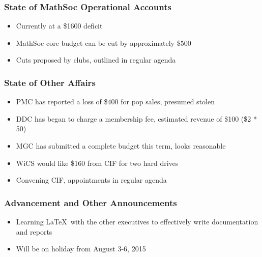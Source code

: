 \subsubsection*{State of MathSoc Operational Accounts}
\begin{itemize}
\item Currently at a \$1600 deficit
\item MathSoc core budget can be cut by approximately \$500 
\item Cuts proposed by clubs, outlined in regular agenda
\end{itemize}

\subsubsection*{State of Other Affairs}
\begin{itemize}
\item PMC has reported a loss of \$400 for pop sales, presumed stolen
\item DDC has began to charge a membership fee, estimated revenue of \$100 (\$2 * 50)
\item MGC has submitted a complete budget this term, looks reasonable
\item WiCS would like \$160 from CIF for two hard drives
\item Convening CIF, appointments in regular agenda
\end{itemize}

\subsubsection*{Advancement and Other Announcements}
\begin{itemize}
\item Learning \LaTeX\ with the other executives to effectively write documentation and reports
\item Will be on holiday from August 3-6, 2015
\end{itemize}
